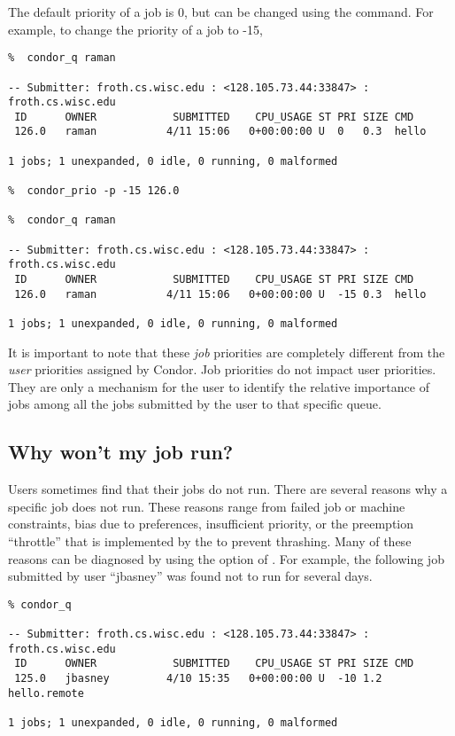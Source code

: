 The default priority of a job is 0, but can be changed using the 
command.  For example, to change the priority of a job to -15,
\begin{verbatim}
%  condor_q raman

-- Submitter: froth.cs.wisc.edu : <128.105.73.44:33847> : froth.cs.wisc.edu
 ID      OWNER            SUBMITTED    CPU_USAGE ST PRI SIZE CMD               
 126.0   raman           4/11 15:06   0+00:00:00 U  0   0.3  hello             

1 jobs; 1 unexpanded, 0 idle, 0 running, 0 malformed

%  condor_prio -p -15 126.0

%  condor_q raman

-- Submitter: froth.cs.wisc.edu : <128.105.73.44:33847> : froth.cs.wisc.edu
 ID      OWNER            SUBMITTED    CPU_USAGE ST PRI SIZE CMD               
 126.0   raman           4/11 15:06   0+00:00:00 U  -15 0.3  hello             

1 jobs; 1 unexpanded, 0 idle, 0 running, 0 malformed
\end{verbatim}

It is important to note that these \emph{job} priorities are completely 
different from the \emph{user} priorities assigned by Condor.  Job priorities
do not impact user priorities.  They are only a mechanism for the user to
identify the relative importance of jobs among all the jobs submitted by the
user to that specific queue.

\subsection{Why won't my job run?}
Users sometimes find that their jobs do not run.  There are several reasons why
a specific job does not run.  These reasons range from failed job or machine
constraints, bias due to preferences, insufficient priority, or the preemption
``throttle'' that is implemented by the  to prevent
thrashing.  Many of these reasons can be diagnosed by using the 
option of .  For example, the following job submitted by user
``jbasney'' was found not to run for several days.
\begin{verbatim}
% condor_q

-- Submitter: froth.cs.wisc.edu : <128.105.73.44:33847> : froth.cs.wisc.edu
 ID      OWNER            SUBMITTED    CPU_USAGE ST PRI SIZE CMD               
 125.0   jbasney         4/10 15:35   0+00:00:00 U  -10 1.2  hello.remote      

1 jobs; 1 unexpanded, 0 idle, 0 running, 0 malformed
\end{verbatim}

